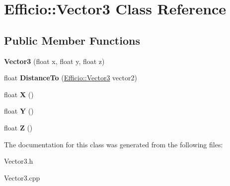 \hypertarget{class_efficio_1_1_vector3}{}\section{Efficio\+:\+:Vector3 Class Reference}
\label{class_efficio_1_1_vector3}
\subsection*{Public Member Functions}
\begin{DoxyCompactItemize}
\item 
{\bfseries Vector3} (float x, float y, float z)\hypertarget{class_efficio_1_1_vector3_a25ddecf52b20f83dad77f70f5fe856d7}{}\label{class_efficio_1_1_vector3_a25ddecf52b20f83dad77f70f5fe856d7}

\item 
float {\bfseries Distance\+To} (\hyperlink{class_efficio_1_1_vector3}{Efficio\+::\+Vector3} vector2)\hypertarget{class_efficio_1_1_vector3_ae819761f590d1f73677206aeb5933f50}{}\label{class_efficio_1_1_vector3_ae819761f590d1f73677206aeb5933f50}

\item 
float {\bfseries X} ()\hypertarget{class_efficio_1_1_vector3_a64c3100486b0bb40756a2ab871ec571a}{}\label{class_efficio_1_1_vector3_a64c3100486b0bb40756a2ab871ec571a}

\item 
float {\bfseries Y} ()\hypertarget{class_efficio_1_1_vector3_a2a49ce0090a5505d92c6cefa84afab5e}{}\label{class_efficio_1_1_vector3_a2a49ce0090a5505d92c6cefa84afab5e}

\item 
float {\bfseries Z} ()\hypertarget{class_efficio_1_1_vector3_ab2befc75a1b0c356ac23dd2ae9ef7041}{}\label{class_efficio_1_1_vector3_ab2befc75a1b0c356ac23dd2ae9ef7041}

\end{DoxyCompactItemize}


The documentation for this class was generated from the following files\+:\begin{DoxyCompactItemize}
\item 
Vector3.\+h\item 
Vector3.\+cpp\end{DoxyCompactItemize}
